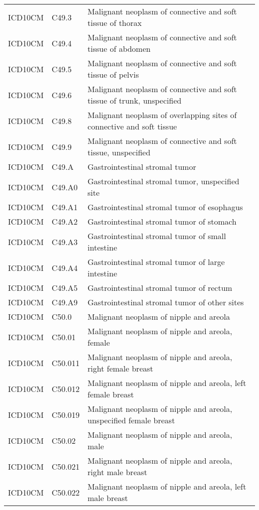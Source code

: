 \begin{table}[ht]
\begin{tabular}{lll}
  ICD10CM & C49.3 & Malignant neoplasm of connective and soft tissue of thorax \\ 
  ICD10CM & C49.4 & Malignant neoplasm of connective and soft tissue of abdomen \\ 
  ICD10CM & C49.5 & Malignant neoplasm of connective and soft tissue of pelvis \\ 
  ICD10CM & C49.6 & Malignant neoplasm of connective and soft tissue of trunk, unspecified \\ 
  ICD10CM & C49.8 & Malignant neoplasm of overlapping sites of connective and soft tissue \\ 
  ICD10CM & C49.9 & Malignant neoplasm of connective and soft tissue, unspecified \\ 
  ICD10CM & C49.A & Gastrointestinal stromal tumor \\ 
  ICD10CM & C49.A0 & Gastrointestinal stromal tumor, unspecified site \\ 
  ICD10CM & C49.A1 & Gastrointestinal stromal tumor of esophagus \\ 
  ICD10CM & C49.A2 & Gastrointestinal stromal tumor of stomach \\ 
  ICD10CM & C49.A3 & Gastrointestinal stromal tumor of small intestine \\ 
  ICD10CM & C49.A4 & Gastrointestinal stromal tumor of large intestine \\ 
  ICD10CM & C49.A5 & Gastrointestinal stromal tumor of rectum \\ 
  ICD10CM & C49.A9 & Gastrointestinal stromal tumor of other sites \\ 
  ICD10CM & C50.0 & Malignant neoplasm of nipple and areola \\ 
  ICD10CM & C50.01 & Malignant neoplasm of nipple and areola, female \\ 
  ICD10CM & C50.011 & Malignant neoplasm of nipple and areola, right female breast \\ 
  ICD10CM & C50.012 & Malignant neoplasm of nipple and areola, left female breast \\ 
  ICD10CM & C50.019 & Malignant neoplasm of nipple and areola, unspecified female breast \\ 
  ICD10CM & C50.02 & Malignant neoplasm of nipple and areola, male \\ 
  ICD10CM & C50.021 & Malignant neoplasm of nipple and areola, right male breast \\ 
  ICD10CM & C50.022 & Malignant neoplasm of nipple and areola, left male breast \\ 

\end{tabular}
\end{table}
